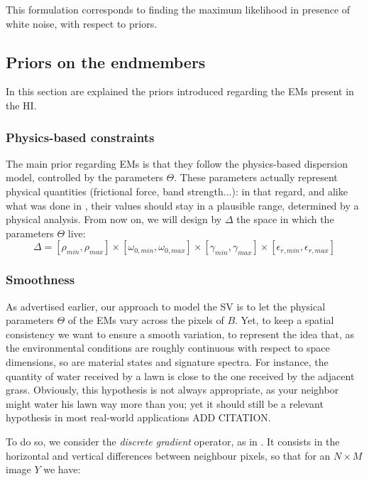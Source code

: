 \documentclass{article}
\begin{document}
This formulation corresponds to finding the maximum likelihood in presence of white noise, with respect to priors.

\subsection{Priors on the endmembers}
In this section are explained the priors introduced regarding the EMs present in the HI.

\subsubsection{Physics-based constraints}

The main prior regarding EMs is that they follow the physics-based dispersion model, controlled by the parameters $\Theta$. These parameters actually represent physical quantities (frictional force, band strength...): in that regard, and alike what was done in \cite{janiczek_differentiable_2020}, their values should stay in a plausible range, determined by a physical analysis. From now on, we will design by $\Delta$ the space in which the parameters $\Theta$ live:
$$\Delta = [\rho_{min}, \rho_{max}] \times [\omega_{0, min}, \omega_{0, max}] \times [\gamma_{min}, \gamma_{max}] \times [\epsilon_{r, min}, \epsilon_{r, max}]$$

\subsubsection{Smoothness}\label{sec:EM-smoothness}

As advertised earlier, our approach to model the SV is to let the physical parameters $\Theta$ of the EMs vary across the pixels of $B$. Yet, to keep a spatial consistency we want to ensure a smooth variation, to represent the idea that, as the environmental conditions are roughly continuous with respect to space dimensions, so are material states and signature spectra. For instance, the quantity of water received by a lawn is close to the one received by the adjacent grass. Obviously, this hypothesis is not always appropriate, as your neighbor might water his lawn way more than you; yet it should still be a relevant hypothesis in most real-world applications ADD CITATION.

To do so, we consider the \emph{discrete gradient} operator, as in \citet{condat_generic_2014}. It consists in the horizontal and vertical differences between neighbour pixels, so that for an $N \times M$ image $Y$ we have:
\end{document}
